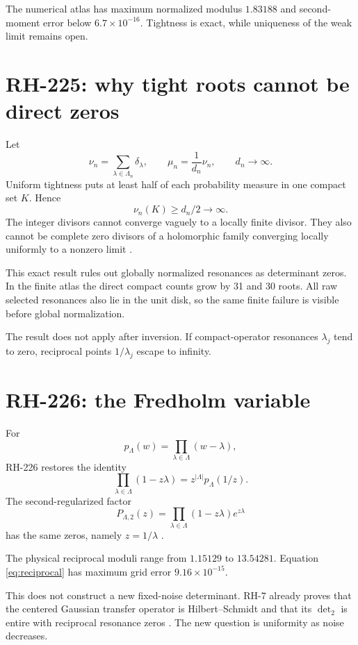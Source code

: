 \documentclass[11pt]{article}
\theoremstyle{remark}\newtheorem{remark}[theorem]{Remark}
\begin{document}
The numerical atlas has maximum normalized modulus $1.83188$ and
second-moment error below $6.7\times10^{-16}$. Tightness is exact, while
uniqueness of the weak limit remains open.

\section{RH-225: why tight roots cannot be direct zeros}

Let
\[
 \nu_n=\sum_{\lambda\in\Lambda_n}\delta_\lambda,\qquad
 \mu_n=\frac1{d_n}\nu_n,\qquad d_n\to\infty.
\]
Uniform tightness puts at least half of each probability measure in one
compact set $K$. Hence
\[
 \nu_n(K)\ge d_n/2\longrightarrow\infty.
\]
The integer divisors cannot converge vaguely to a locally finite divisor.
They also cannot be complete zero divisors of a holomorphic family converging
locally uniformly to a nonzero limit \citep{WangRH225,Conway1978}.

This exact result rules out globally normalized resonances as determinant
zeros. In the finite atlas the direct compact counts grow by 31 and 30 roots.
All raw selected resonances also lie in the unit disk, so the same finite
failure is visible before global normalization.

The result does not apply after inversion. If compact-operator resonances
$\lambda_j$ tend to zero, reciprocal points $1/\lambda_j$ escape to infinity.

\section{RH-226: the Fredholm variable}

For
\[
 p_\Lambda(w)=\prod_{\lambda\in\Lambda}(w-\lambda),
\]
RH-226 restores the identity
\begin{equation}\label{eq:reciprocal}
 \prod_{\lambda\in\Lambda}(1-z\lambda)
 =z^{|\Lambda|}p_\Lambda(1/z).
\end{equation}
The second-regularized factor
\begin{equation}\label{eq:det2}
 P_{\Lambda,2}(z)=
 \prod_{\lambda\in\Lambda}(1-z\lambda)e^{z\lambda}
\end{equation}
has the same zeros, namely $z=1/\lambda$
\citep{WangRH226,Simon2005}.

The physical reciprocal moduli range from $1.15129$ to $13.54281$.
Equation \eqref{eq:reciprocal} has maximum grid error
$9.16\times10^{-15}$.

This does not construct a new fixed-noise determinant. RH-7 already proves
that the centered Gaussian transfer operator is Hilbert--Schmidt and that its
$\det_2$ is entire with reciprocal resonance zeros \citep{WangRH7}. The new
question is uniformity as noise decreases.
\end{document}
